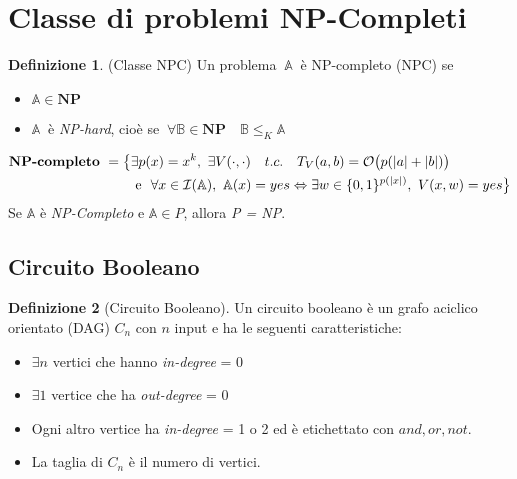 \documentclass[a4paper]{article}
\theoremstyle{definition}
\newtheorem{definit}{Definizione}[subsection]
\newcommand{\np}{\mathbf{NP}}
\newcommand{\prob}[1]{\mathbb{#1}}
\begin{document}
	\section{Classe di problemi NP-Completi}
		\begin{definit}(Classe NPC)
			Un problema $\ \prob{A}\ $ è NP-completo (NPC) se
			\begin{itemize}
				\item $ \prob{A} \in \np $
				\item $ \prob{A}\ $ è \textit{NP-hard}, cioè se $ \ \forall \prob{B} \in \np \quad \prob{B}\leq_K \prob{A} $
			\end{itemize}
		
		\begin{align*}
			\mathbf{NP}\text{\textbf{-completo}}\ = \big\lbrace & \exists p(x) = x^k,\ \exists V(\cdot, \cdot) \quad t.c.\quad T_V(a, b) = \mathcal{O}\big(p(|a|+|b|)\big) \\
			&\text{ e } \ \forall x \in \mathcal{I}(\mathbb{A}),\ \mathbb{A}(x)=yes \Leftrightarrow \exists w \in \{0, 1 \}^{p(|x|)},\ V(x, w)=yes \big\rbrace
		\end{align*}
		Se $\mathbb{A}$ è \textit{NP-Completo} e $\mathbb{A}\in P$, allora \textit{P = NP}.
		\end{definit}
		
	\subsection{Circuito Booleano}
		\begin{definit}[Circuito Booleano]
			Un circuito booleano è un grafo aciclico orientato (DAG) $ C_n $ con $ n $ input e ha le seguenti caratteristiche:
			\begin{itemize}
				\item $ \exists n $ vertici che hanno \textit{in-degree} = 0
				\item $ \exists 1 $ vertice che ha \textit{out-degree} = 0
				\item Ogni altro vertice ha \textit{in-degree} = 1 o 2 ed è etichettato con $ and, or, not $.
				\item La taglia di $ C_n $ è il numero di vertici.
			\end{itemize}
		\end{definit}
		
\end{document}

